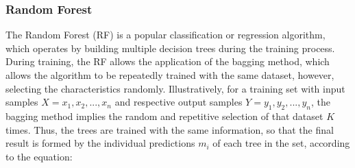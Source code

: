 \documentclass{ieeeaccess}
\begin{document}

\subsubsection{Random Forest}
\label{subsubsec:floresta}

The Random Forest (RF) is a popular classification or regression algorithm, which operates by building multiple decision trees during the training process. During training, the RF allows the application of the bagging method, which allows the algorithm to be repeatedly trained with the same dataset, however, selecting the characteristics randomly. Illustratively, for a training set with  input samples $ X = x_1, x_2, ..., x_n $ and respective  output samples $ Y = y_1, y_2, ..., y_n $, the bagging method implies the random and repetitive selection of that dataset $ K $ times. Thus, the trees are trained with the same information, so that the final result is formed by the individual predictions $ m_i $ of each tree in the set, according to the equation:

\end{document}
